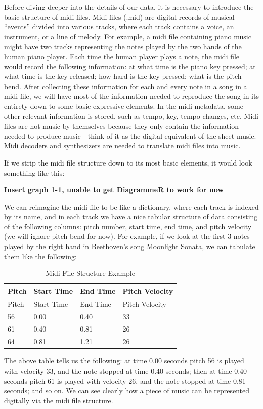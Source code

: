\documentclass[12pt,oneside]{chicagocapstone}
\begin{document}
Before diving deeper into the details of our data, it is necessary to introduce the basic structure of midi files. Midi files (.mid) are digital records of musical ``events'' divided into various tracks, where each track contains a voice, an instrument, or a line of melody. For example, a midi file containing piano music might have two tracks representing the notes played by the two hands of the human piano player. Each time the human player plays a note, the midi file would record the following information: at what time is the piano key pressed; at what time is the key released; how hard is the key pressed; what is the pitch bend. After collecting these information for each and every note in a song in a midi file, we will have most of the information needed to reproduce the song in its entirety down to some basic expressive elements. In the midi metadata, some other relevant information is stored, such as tempo, key, tempo changes, etc. Midi files are not music by themselves because they only contain the information needed to produce music - think of it as the digital equivalent of the sheet music. Midi decoders and synthesizers are needed to translate midi files into music.

If we strip the midi file structure down to its most basic elements, it would look something like this:

\textbf{Insert graph 1-1, unable to get DiagrammeR to work for now}

We can reimagine the midi file to be like a dictionary, where each track is indexed by its name, and in each track we have a nice tabular structure of data consisting of the following columns: pitch number, start time, end time, and pitch velocity (we will ignore pitch bend for now). For example, if we look at the first 3 notes played by the right hand in Beethoven's song Moonlight Sonata, we can tabulate them like the following:
\begin{longtable}[]{@{}llll@{}}
\caption{\label{tab:inher} Midi File Structure Example}\tabularnewline
\toprule
Pitch & Start Time & End Time & Pitch Velocity\tabularnewline
\midrule
\endfirsthead
\toprule
Pitch & Start Time & End Time & Pitch Velocity\tabularnewline
\midrule
\endhead
56 & 0.00 & 0.40 & 33\tabularnewline
61 & 0.40 & 0.81 & 26\tabularnewline
64 & 0.81 & 1.21 & 26\tabularnewline
\bottomrule
\end{longtable}
The above table tells us the following: at time 0.00 seconds pitch 56 is played with velocity 33, and the note stopped at time 0.40 seconds; then at time 0.40 seconds pitch 61 is played with velocity 26, and the note stopped at time 0.81 seconds; and so on. We can see clearly how a piece of music can be represented digitally via the midi file structure.
\end{document}

